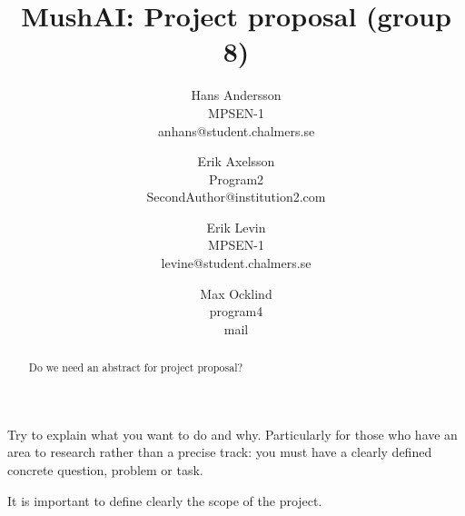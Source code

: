\documentclass[times, 10pt,twocolumn]{article}
\begin{document}
\title{MushAI: Project proposal (group 8)}

\author{Hans Andersson\\
MPSEN-1\\anhans@student.chalmers.se\\
\and
Erik Axelsson\\
Program2\\
SecondAuthor@institution2.com\\
\and
Erik Levin\\
MPSEN-1\\
levine@student.chalmers.se
\and
Max Ocklind\\
program4\\
mail
}

\maketitle
\thispagestyle{empty}

\begin{abstract}
Do we need an abstract for project proposal?
\end{abstract}




Try to explain what you want to do and why. Particularly for those who have an area to research rather than a precise track: you must have a clearly defined concrete question, problem or task.





It is important to define clearly the scope of the project.




\end{document}
